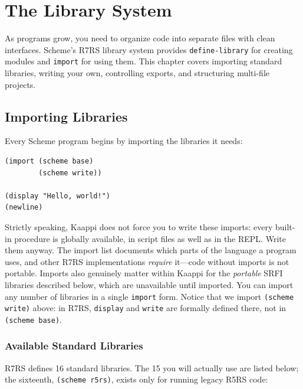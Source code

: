 \chapter{The Library System}
\label{ch:libraries}

As programs grow, you need to organize code into separate files with clean interfaces. Scheme's R7RS library system provides \texttt{define-library} for creating modules and \texttt{import} for using them. This chapter covers importing standard libraries, writing your own, controlling exports, and structuring multi-file projects.

\section{Importing Libraries}

Every Scheme program begins by importing the libraries it needs:

\begin{lstlisting}
(import (scheme base)
        (scheme write))

(display "Hello, world!")
(newline)
\end{lstlisting}

Strictly speaking, Kaappi does not force you to write these imports: every built-in procedure is globally available, in script files as well as in the REPL. Write them anyway. The import list documents which parts of the language a program uses, and other R7RS implementations \emph{require} it---code without imports is not portable. Imports also genuinely matter within Kaappi for the \emph{portable} SRFI libraries described below, which are unavailable until imported. You can import any number of libraries in a single \texttt{import} form. Notice that we import \texttt{(scheme write)} above: in R7RS, \texttt{display} and \texttt{write} are formally defined there, not in \texttt{(scheme base)}.

\subsection{Available Standard Libraries}

R7RS defines 16 standard libraries. The 15 you will actually use are listed below; the sixteenth, \texttt{(scheme r5rs)}, exists only for running legacy R5RS code:

